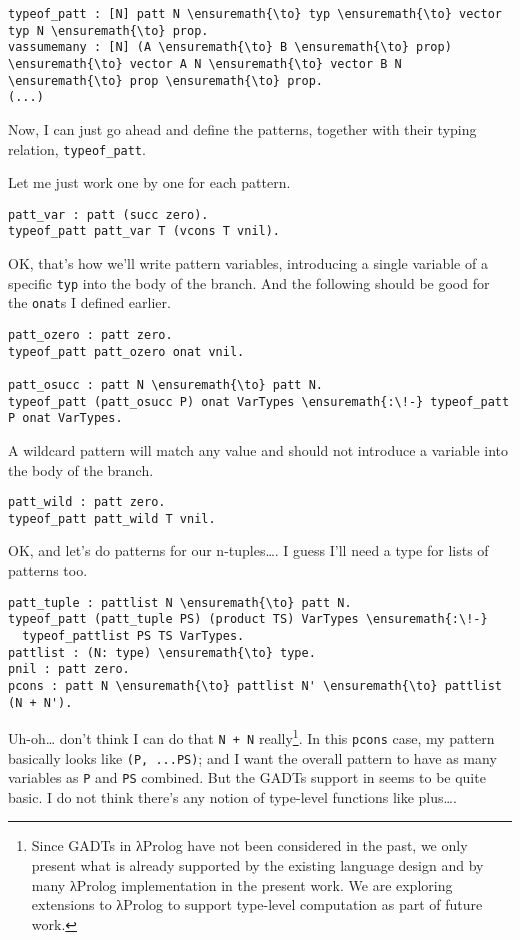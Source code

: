 \begin{verbatim}
typeof_patt : [N] patt N \ensuremath{\to} typ \ensuremath{\to} vector typ N \ensuremath{\to} prop.
vassumemany : [N] (A \ensuremath{\to} B \ensuremath{\to} prop) \ensuremath{\to} vector A N \ensuremath{\to} vector B N \ensuremath{\to} prop \ensuremath{\to} prop.
(...)
\end{verbatim}

Now, I can just go ahead and define the patterns, together with their
typing relation, \texttt{typeof\_patt}.

Let me just work one by one for each pattern.

\begin{verbatim}
patt_var : patt (succ zero).
typeof_patt patt_var T (vcons T vnil).
\end{verbatim}

OK, that's how we'll write pattern variables, introducing a single
variable of a specific \texttt{typ} into the body of the branch. And the
following should be good for the \texttt{onat}s I defined earlier.

\begin{verbatim}
patt_ozero : patt zero.
typeof_patt patt_ozero onat vnil.

patt_osucc : patt N \ensuremath{\to} patt N.
typeof_patt (patt_osucc P) onat VarTypes \ensuremath{:\!-} typeof_patt P onat VarTypes.
\end{verbatim}

A wildcard pattern will match any value and should not introduce a
variable into the body of the branch.

\begin{verbatim}
patt_wild : patt zero.
typeof_patt patt_wild T vnil.
\end{verbatim}

OK, and let's do patterns for our n-tuples\ldots{}. I guess I'll need a
type for lists of patterns too.

\begin{verbatim}
patt_tuple : pattlist N \ensuremath{\to} patt N.
typeof_patt (patt_tuple PS) (product TS) VarTypes \ensuremath{:\!-}
  typeof_pattlist PS TS VarTypes.
pattlist : (N: type) \ensuremath{\to} type.
pnil : patt zero.
pcons : patt N \ensuremath{\to} pattlist N' \ensuremath{\to} pattlist (N + N').
\end{verbatim}

Uh-oh\ldots{} don't think I can do that
\texttt{N\ +\ N\textquotesingle{}}
really\footnote{Since GADTs in \foreignlanguage{greek}{λ}Prolog have not been considered in the past, we only present what is already supported by the existing language design and by many \foreignlanguage{greek}{λ}Prolog implementation in the present work. We are exploring extensions to \foreignlanguage{greek}{λ}Prolog to support type-level computation as part of future work. }.
In this \texttt{pcons} case, my pattern basically looks like
\texttt{(P,\ ...PS)}; and I want the overall pattern to have as many
variables as \texttt{P} and \texttt{PS} combined. But the GADTs support
in \lamprolog seems to be quite basic. I do not think there's any notion
of type-level functions like plus\ldots{}.

